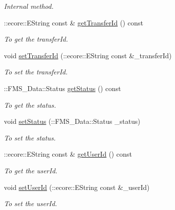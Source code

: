 \begin{DoxyCompactItemize}
\begin{DoxyCompactList}\small\item\em Internal method. \item\end{DoxyCompactList}\item 
::ecore::EString const \& \hyperlink{classFMS__Data_1_1FileTransfer_a950d5e9b80cfc02df7e939e008c593cf}{getTransferId} () const 
\begin{DoxyCompactList}\small\item\em To get the transferId. \item\end{DoxyCompactList}\item 
void \hyperlink{classFMS__Data_1_1FileTransfer_a0d4fb10e18501fad083a43f5be3d8b4b}{setTransferId} (::ecore::EString const \&\_\-transferId)
\begin{DoxyCompactList}\small\item\em To set the transferId. \item\end{DoxyCompactList}\item 
::FMS\_\-Data::Status \hyperlink{classFMS__Data_1_1FileTransfer_a6c0c6514420d5c55ce446aef1cba4bc2}{getStatus} () const 
\begin{DoxyCompactList}\small\item\em To get the status. \item\end{DoxyCompactList}\item 
void \hyperlink{classFMS__Data_1_1FileTransfer_ae29c23c87945faff599b8339a5845557}{setStatus} (::FMS\_\-Data::Status \_\-status)
\begin{DoxyCompactList}\small\item\em To set the status. \item\end{DoxyCompactList}\item 
::ecore::EString const \& \hyperlink{classFMS__Data_1_1FileTransfer_af6d3c87b5aafedb99c52b46e339ae4d0}{getUserId} () const 
\begin{DoxyCompactList}\small\item\em To get the userId. \item\end{DoxyCompactList}\item 
void \hyperlink{classFMS__Data_1_1FileTransfer_ac1ea16ed7937808c64039a1dd29f6c47}{setUserId} (::ecore::EString const \&\_\-userId)
\begin{DoxyCompactList}\small\item\em To set the userId. \item\end{DoxyCompactList}\item 

\end{DoxyCompactItemize}
